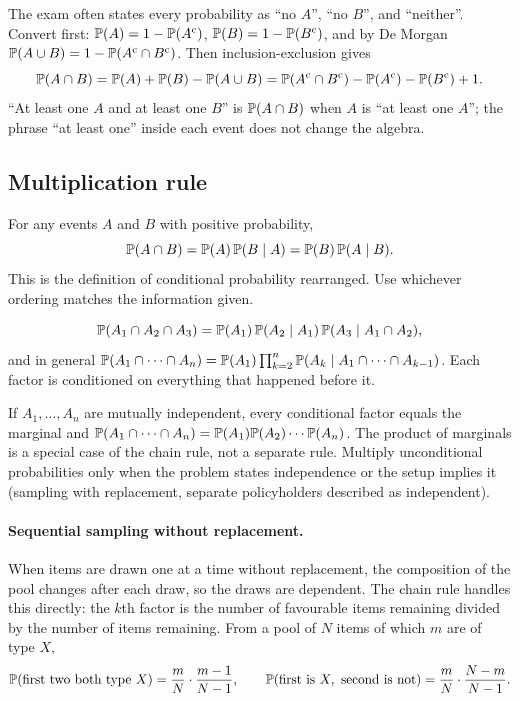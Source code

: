 \begin{keyfact}
The exam often states every probability as ``no $A$'', ``no $B$'', and ``neither''. Convert first:
$\mathbb{P}(A) = 1 - \mathbb{P}(A^{\mathrm{c}})$, $\mathbb{P}(B) = 1 - \mathbb{P}(B^{\mathrm{c}})$, and by De Morgan
$\mathbb{P}(A \cup B) = 1 - \mathbb{P}(A^{\mathrm{c}} \cap B^{\mathrm{c}})$. Then inclusion-exclusion gives
\[
\mathbb{P}(A \cap B) = \mathbb{P}(A) + \mathbb{P}(B) - \mathbb{P}(A \cup B)
 = \mathbb{P}(A^{\mathrm{c}} \cap B^{\mathrm{c}}) - \mathbb{P}(A^{\mathrm{c}}) - \mathbb{P}(B^{\mathrm{c}}) + 1.
\]
``At least one $A$ and at least one $B$'' is $\mathbb{P}(A \cap B)$ when $A$ is ``at least one $A$'';
the phrase ``at least one'' inside each event does not change the algebra.
\end{keyfact}

\subsection{Multiplication rule}

\begin{keyfact}
For any events $A$ and $B$ with positive probability,
\[
\mathbb{P}(A \cap B) = \mathbb{P}(A)\,\mathbb{P}(B \mid A) = \mathbb{P}(B)\,\mathbb{P}(A \mid B).
\]
This is the definition of conditional probability rearranged. Use whichever ordering matches
the information given.
\end{keyfact}

\begin{keyfact}
\[
\mathbb{P}(A_1 \cap A_2 \cap A_3) = \mathbb{P}(A_1)\,\mathbb{P}(A_2 \mid A_1)\,\mathbb{P}(A_3 \mid A_1 \cap A_2),
\]
and in general
$\mathbb{P}(A_1 \cap \cdots \cap A_n) = \mathbb{P}(A_1) \prod_{k=2}^{n} \mathbb{P}(A_k \mid A_1 \cap \cdots \cap A_{k-1})$.
Each factor is conditioned on everything that happened before it.
\end{keyfact}

\begin{keyfact}
If $A_1, \dots, A_n$ are mutually independent, every conditional factor equals the marginal and
$\mathbb{P}(A_1 \cap \cdots \cap A_n) = \mathbb{P}(A_1)\mathbb{P}(A_2)\cdots\mathbb{P}(A_n)$.
The product of marginals is a special case of the chain rule, not a separate rule. Multiply
unconditional probabilities only when the problem states independence or the setup implies it
(sampling with replacement, separate policyholders described as independent).
\end{keyfact}

\paragraph{Sequential sampling without replacement.} When items are drawn one at a time without
replacement, the composition of the pool changes after each draw, so the draws are dependent. The
chain rule handles this directly: the $k$th factor is the number of favourable items remaining
divided by the number of items remaining. From a pool of $N$ items of which $m$ are of type $X$,
\[
\mathbb{P}(\text{first two both type } X) = \frac{m}{N}\cdot\frac{m-1}{N-1}, \qquad
\mathbb{P}(\text{first is } X,\ \text{second is not}) = \frac{m}{N}\cdot\frac{N-m}{N-1}.
\]

